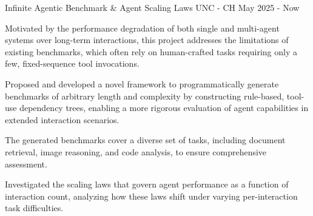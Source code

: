 \clearpage
{}

\begin{cventries}

	\cventry
	{} %
	{Infinite Agentic Benchmark \& Agent Scaling Laws} %
	{UNC - CH} %
	{May 2025 - Now} %
	{
		\begin{cvitems} %
			\item Motivated by the performance degradation of both single and multi-agent systems over long-term interactions, this project addresses the limitations of existing benchmarks, which often rely on human-crafted tasks requiring only a few, fixed-sequence tool invocations.
			\item Proposed and developed a novel framework to programmatically generate benchmarks of arbitrary length and complexity by constructing rule-based, tool-use dependency trees, enabling a more rigorous evaluation of agent capabilities in extended interaction scenarios.
			\item The generated benchmarks cover a diverse set of tasks, including document retrieval, image reasoning, and code analysis, to ensure comprehensive assessment.
			\item Investigated the scaling laws that govern agent performance as a function of interaction count, analyzing how these laws shift under varying per-interaction task difficulties.
		\end{cvitems}
	}


\end{cventries}

